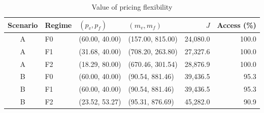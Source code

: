 \begin{table}[ht]
\centering\footnotesize
\caption{Value of pricing flexibility}\label{tab:pricing}
\begin{tabular}{@{}clllrr@{}}\toprule
Scenario & Regime & $(p_v,p_f)$ & $(m_v,m_f)$ & $J$ & Access (\%)\\\midrule
A & F0 & (60.00, 40.00) & (157.00, 815.00) & 24,080.0 & 100.0\\
A & F1 & (31.68, 40.00) & (708.20, 263.80) & 27,327.6 & 100.0\\
A & F2 & (18.29, 80.00) & (670.46, 301.54) & 28,876.9 & 100.0\\
B & F0 & (60.00, 40.00) & (90.54, 881.46) & 39,436.5 & 95.3\\
B & F1 & (60.00, 40.00) & (90.54, 881.46) & 39,436.5 & 95.3\\
B & F2 & (23.52, 53.27) & (95.31, 876.69) & 45,282.0 & 90.9\\
\bottomrule\end{tabular}
\end{table}
